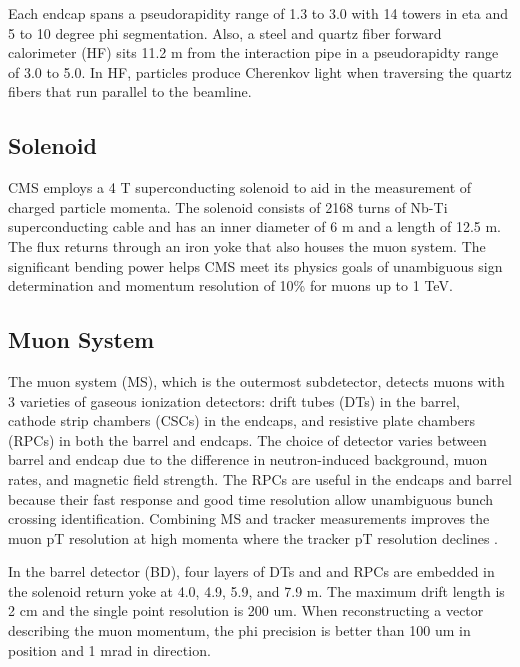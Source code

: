 \documentclass[12pt]{article}
\begin{document}
    Each endcap spans a pseudorapidity range of 1.3 to 3.0 with 14 towers in eta and 5 to 10 degree phi segmentation. Also, a steel and quartz fiber forward calorimeter (HF) sits 11.2 m from the interaction pipe in a pseudorapidty range of 3.0 to 5.0. In HF, particles produce Cherenkov light when traversing the quartz fibers that run parallel to the beamline. 

\subsection{Solenoid}
    CMS employs a 4 T superconducting solenoid to aid in the measurement of charged particle momenta. The solenoid consists of 2168 turns of Nb-Ti superconducting cable and has an inner diameter of 6 m and a length of 12.5 m. The flux returns through an iron yoke that also houses the muon system. The significant  bending power helps CMS meet its physics goals of unambiguous sign determination and momentum resolution of 10\% for muons up to 1 TeV.

\subsection{Muon System}
    The muon system (MS), which is the outermost subdetector, detects muons with 3 varieties of gaseous ionization detectors: drift tubes (DTs) in the barrel, cathode strip chambers (CSCs) in the endcaps, and resistive plate chambers (RPCs) in both the barrel and endcaps. The choice of detector varies between barrel and endcap due to the difference in neutron-induced background, muon rates, and magnetic field strength. The RPCs are useful in the endcaps and barrel because their fast response and good time resolution allow unambiguous bunch crossing identification. Combining MS and tracker measurements improves the muon pT resolution at high momenta where the tracker pT resolution declines .

    In the barrel detector (BD), four layers of DTs and and RPCs are embedded in the solenoid return yoke at 4.0, 4.9, 5.9, and 7.9 m.  The maximum drift length is 2 cm and the single point resolution is 200 um. When reconstructing a vector describing the muon momentum, the phi precision is better than 100 um in position and 1 mrad in direction. 
\end{document}
